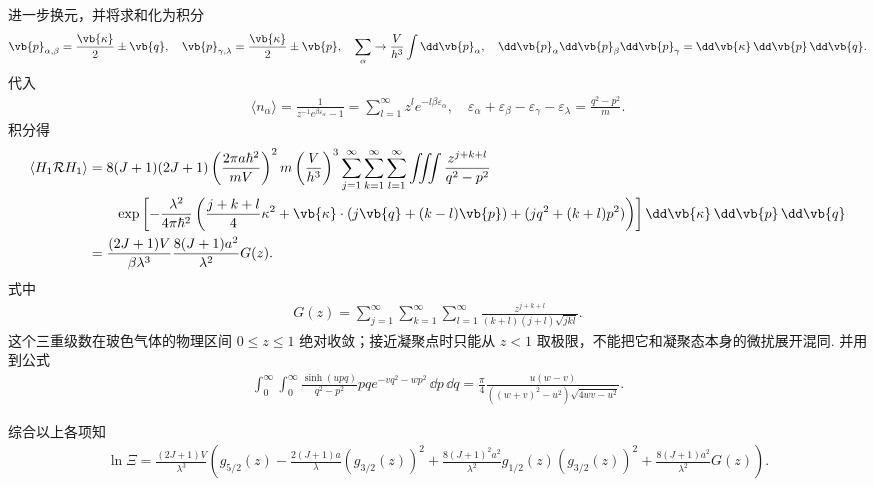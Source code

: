 进一步换元，并将求和化为积分
\begin{align*}
	\vb{p}_{\alpha,\beta} = \frac{\vb{\kappa}}{2} \pm \vb{q}, \quad \vb{p}_{\gamma,\lambda} = \frac{\vb{\kappa}}{2} \pm \vb{p}, \quad \sum_{\alpha} \to \frac{V}{h^{3}} \int \dd \vb{p}_{\alpha}, \quad \dd \vb{p}_{\alpha} \dd \vb{p}_{\beta} \dd \vb{p}_{\gamma} = \dd \vb{\kappa} \, \dd \vb{p} \, \dd \vb{q}.
\end{align*}
代入
\begin{align*}
	\langle n_{\alpha} \rangle = \frac{1}{z^{-1} e^{\beta \varepsilon_{\alpha}} - 1} = \sum_{l=1}^{\infty} z^{l} e^{-l\beta \varepsilon_{\alpha}}, \quad \varepsilon_{\alpha} + \varepsilon_{\beta} - \varepsilon_{\gamma} - \varepsilon_{\lambda} = \frac{q^{2} - p^{2}}{m}.
\end{align*}
积分得
\begin{align*}
	\langle H_{1} \mathcal{R} H_{1} \rangle &= 8(J+1)(2J+1) \left( \frac{2\pi a \hbar^{2}}{m V} \right)^{2} m \left( \frac{V}{h^{3}} \right)^{3} \sum_{j=1}^{\infty} \sum_{k=1}^{\infty} \sum_{l=1}^{\infty} \iiint \frac{z^{j+k+l}}{q^{2} - p^{2}}\\&\qquad \exp\left[ -\frac{\lambda^{2}}{4\pi\hbar^{2}} \left( \frac{j+k+l}{4} \kappa^{2} + \vb{\kappa} \cdot (j\vb{q} + (k-l)\vb{p}) + (j q^{2} + (k+l) p^{2}) \right) \right] \dd \vb{\kappa} \, \dd \vb{p} \, \dd \vb{q} \\
	&= \frac{(2J+1) V}{\beta \lambda^{3}} \frac{8(J+1) a^{2}}{\lambda^{2}} G(z).
\end{align*}
式中
\begin{align*}
	G(z) = \sum_{j=1}^{\infty} \sum_{k=1}^{\infty} \sum_{l=1}^{\infty} \frac{z^{j+k+l}}{(k+l)(j+l) \sqrt{jkl}}.
\end{align*}
这个三重级数在玻色气体的物理区间 \(0\le z\le1\) 绝对收敛；接近凝聚点时只能从 \(z<1\) 取极限，不能把它和凝聚态本身的微扰展开混同.
并用到公式
\begin{align*}
	\int_{0}^{\infty} \int_{0}^{\infty} \frac{\sinh(u p q)}{q^{2} - p^{2}} p q e^{-v q^{2} - w p^{2}} \, \dd p \, \dd q = \frac{\pi}{4} \frac{u (w - v)}{((w+v)^{2} - u^{2}) \sqrt{4wv - u^{2}}}.
\end{align*}

综合以上各项知
\begin{align*}
	\ln \Xi = \frac{(2J+1) V}{\lambda^{3}} \left( g_{5/2}(z) - \frac{2(J+1) a}{\lambda} (g_{3/2}(z))^{2} + \frac{8(J+1)^{2} a^{2}}{\lambda^{2}} g_{1/2}(z) (g_{3/2}(z))^{2} + \frac{8(J+1) a^{2}}{\lambda^{2}} G(z) \right).
\end{align*}

